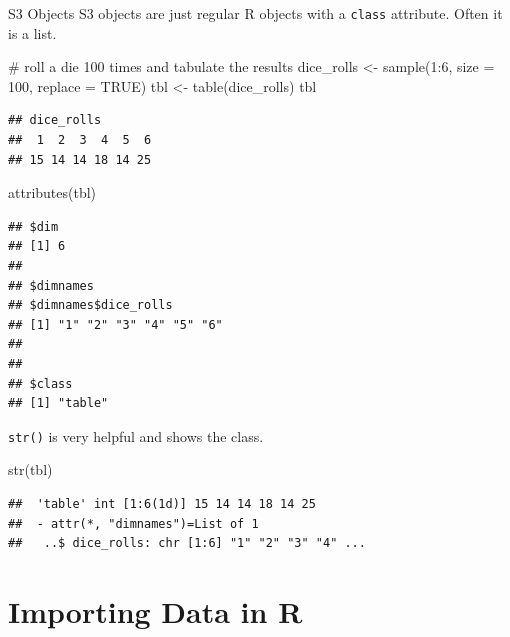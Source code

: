 \documentclass[
  9pt,
  ignorenonframetext,
]{beamer}
\newenvironment{Shaded}{\begin{snugshade}}{\end{snugshade}}
\newcommand{\CommentTok}[1]{\textcolor[rgb]{0.50,0.62,0.50}{#1}}
\newcommand{\DataTypeTok}[1]{\textcolor[rgb]{0.87,0.87,0.75}{#1}}
\newcommand{\DecValTok}[1]{\textcolor[rgb]{0.86,0.86,0.80}{#1}}
\newcommand{\KeywordTok}[1]{\textcolor[rgb]{0.94,0.87,0.69}{#1}}
\newcommand{\NormalTok}[1]{\textcolor[rgb]{0.80,0.80,0.80}{#1}}
\newcommand{\OperatorTok}[1]{\textcolor[rgb]{0.94,0.94,0.82}{#1}}
\newcommand{\OtherTok}[1]{\textcolor[rgb]{0.94,0.94,0.56}{#1}}
\newcommand{\StringTok}[1]{\textcolor[rgb]{0.80,0.58,0.58}{#1}}
\begin{document}
\begin{frame}[fragile]{S3 Objects}
\protect\hypertarget{s3-objects-1}{}
S3 objects are just regular R objects with a \texttt{class} attribute.
Often it is a list.

\vfill
\footnotesize

\begin{Shaded}
\begin{Highlighting}[]
\CommentTok{\# roll a die 100 times and tabulate the results}
\NormalTok{dice\_rolls \textless{}{-}}\StringTok{ }\KeywordTok{sample}\NormalTok{(}\DecValTok{1}\OperatorTok{:}\DecValTok{6}\NormalTok{, }\DataTypeTok{size =} \DecValTok{100}\NormalTok{, }\DataTypeTok{replace =} \OtherTok{TRUE}\NormalTok{)}
\NormalTok{tbl \textless{}{-}}\StringTok{ }\KeywordTok{table}\NormalTok{(dice\_rolls)}
\NormalTok{tbl}
\end{Highlighting}
\end{Shaded}

\begin{verbatim}
## dice_rolls
##  1  2  3  4  5  6 
## 15 14 14 18 14 25
\end{verbatim}

\begin{Shaded}
\begin{Highlighting}[]
\KeywordTok{attributes}\NormalTok{(tbl)}
\end{Highlighting}
\end{Shaded}

\begin{verbatim}
## $dim
## [1] 6
## 
## $dimnames
## $dimnames$dice_rolls
## [1] "1" "2" "3" "4" "5" "6"
## 
## 
## $class
## [1] "table"
\end{verbatim}

\vfill

\texttt{str()} is very helpful and shows the class.

\begin{Shaded}
\begin{Highlighting}[]
\KeywordTok{str}\NormalTok{(tbl)}
\end{Highlighting}
\end{Shaded}

\begin{verbatim}
##  'table' int [1:6(1d)] 15 14 14 18 14 25
##  - attr(*, "dimnames")=List of 1
##   ..$ dice_rolls: chr [1:6] "1" "2" "3" "4" ...
\end{verbatim}
\end{frame}

\hypertarget{importing-data-in-r}{%
\section{Importing Data in R}\label{importing-data-in-r}}
\end{document}
